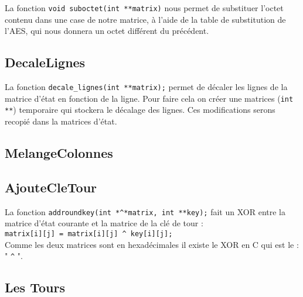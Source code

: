 \documentclass[french, 12pt]{article}
\begin{document}
	La fonction \verb|void suboctet(int **matrix)|  nous permet de substituer l'octet contenu dans une case de notre matrice, à l'aide de la table de substitution de l'AES, qui nous donnera un octet différent du précédent.
		
	\subsection*{DecaleLignes}
	
	La fonction \verb|decale_lignes(int **matrix);| permet de décaler les lignes de la matrice d'état en fonction de la ligne. Pour faire cela on créer une matrices (\verb|int **|) temporaire qui stockera le décalage des lignes. Ces modifications serons recopié dans la matrices d'état.
	
	\newpage
	
	\subsection*{MelangeColonnes}
	
	

	\subsection*{AjouteCleTour}
	
	La fonction \verb|addroundkey(int *^*matrix, int **key);| fait un XOR entre la matrice d'état courante et la matrice de la clé de tour : \\
	 \verb|matrix[i][j] = matrix[i][j] ^ key[i][j];| \\
	 Comme les deux matrices sont en hexadécimales il existe le XOR en C qui est le : " \verb|^| ". 
	
	\subsection*{Les Tours}
\end{document}
